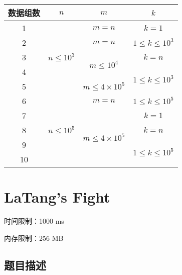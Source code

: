 \documentclass[UTF8]{ctexart}
\begin{document}
\begin{tabular}{|c|c|c|c|}
\hline
  数据组数 & $n$                            & $m$                                    & $k$                                   \\ \hline
  1    & \multirow{5}{*}{$n \leq 10^3$} & $m = n$                                & $k=1$                                   \\ \cline{1-1} \cline{3-4} 
  2    &                                & $m = n$                                & $1 \leq k \leq 10^3$                  \\ \cline{1-1} \cline{3-4} 
  3    &                                & \multirow{2}{*}{$m \leq 10^4$}         & $k = n$                                 \\ \cline{1-1} \cline{4-4} 
  4    &                                &                                        & \multirow{2}{*}{$1 \leq k \leq 10^3$} \\ \cline{1-1} \cline{3-3}
  5    &                                & $m \leq 4\times 10^5$                  &                                       \\ \hline
  6    & \multirow{5}{*}{$n \leq 10^5$} & $m = n$                                & $1 \leq k \leq 10^5$                  \\ \cline{1-1} \cline{3-4} 
  7    &                                & \multirow{4}{*}{$m \leq 4\times 10^5$} & $k=1$                                 \\ \cline{1-1} \cline{4-4} 
  8    &                                &                                        & $k=n$                                 \\ \cline{1-1} \cline{4-4} 
  9    &                                &                                        & \multirow{2}{*}{$1 \leq k \leq 10^5$} \\ \cline{1-1}
  10   &                                &                                        &                                       \\ \hline
\end{tabular}


\newpage
\section{LaTang's Fight}

时间限制：1000 ms

内存限制：256 MB

\subsection{题目描述}
\end{document}
